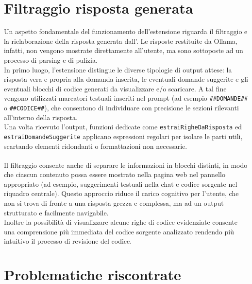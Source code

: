 \section{Filtraggio risposta generata}
\noindent Un aspetto fondamentale del funzionamento dell'estensione riguarda il filtraggio e la rielaborazione della risposta generata dall’. Le risposte restituite da Ollama, infatti, non vengono mostrate direttamente all’utente, ma sono sottoposte ad un processo di parsing e di pulizia.\\
In primo luogo, l’estensione distingue le diverse tipologie di output attese: la risposta vera e propria alla domanda inserita, le eventuali domande suggerite e gli eventuali blocchi di codice generati da visualizzare e/o scaricare. A tal fine vengono utilizzati marcatori testuali inseriti nel prompt (ad esempio \texttt{\#\#DOMANDE\#\#} o \texttt{\#\#CODICE\#\#}), che consentono di individuare con precisione le sezioni rilevanti all’interno della risposta. \\Una volta ricevuto l’output, funzioni dedicate come \texttt{estraiRigheDaRisposta} ed \texttt{estraiDomandeSuggerite} applicano espressioni regolari per isolare le parti utili, scartando elementi ridondanti o formattazioni non necessarie.\\
\\
Il filtraggio consente anche di separare le informazioni in blocchi distinti, in modo che ciascun contenuto possa essere mostrato nella pagina web nel pannello appropriato (ad esempio, suggerimenti testuali nella chat e codice sorgente nel riquadro centrale). Questo approccio riduce il carico cognitivo per l’utente, che non si trova di fronte a una risposta grezza e complessa, ma ad un output strutturato e facilmente navigabile.\\ Inoltre la possibilità di visualizzare alcune righe di codice evidenziate consente una comprensione più immediata del codice sorgente analizzato rendendo più intuitivo il processo di revisione del codice.

\section{Problematiche riscontrate}